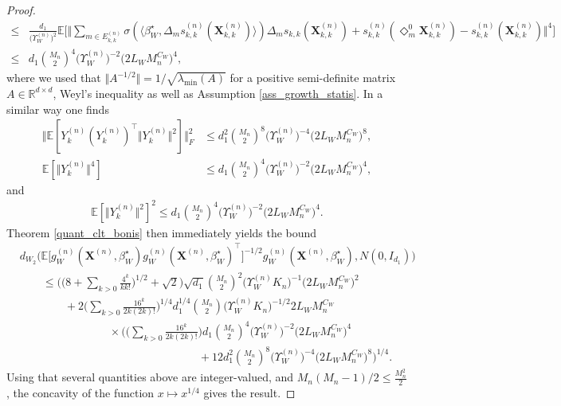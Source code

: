 \documentclass{article}
\begin{document}
\begin{proof}
\begin{align*}
        \leq &  \frac{d_1}{\big(\Upsilon_W^{(n)}\big)^2}  \mathbb{E}\bigg[ \bigg\Vert \sum_{m\in E_{k,k}^{(n)}} \sigma ( \langle \beta_W^{\star} , \Delta_m s_{k,k}^{(n)}(\mathbf{X}_{k,k}^{(n)}) \rangle )  \Delta_m s_{k,k}(\mathbf{X}_{k,k}^{(n)}) +  s_{k,k}^{(n)}(\Diamond_{m}^{0} \mathbf{X}_{k,k}^{(n)}) - s_{k,k}^{(n)}(\mathbf{X}_{k,k}^{(n)}) \bigg\Vert^4 \bigg] \\
        \leq & d_1 \binom{M_n}{2}^4 \big(\Upsilon_W^{(n)}\big)^{-2} \big(2 L_W M_n^{C_W}  \big)^4,
    \end{align*}
    where we used that $\Vert A^{-1/2} \Vert = 1/\sqrt{\lambda_\mathrm{min}(A)}$ for a positive semi-definite matrix $A \in \mathbb{R}^{d \times d}$, Weyl's inequality as well as Assumption \ref{ass_growth_statis}. In a similar way one finds
    \begin{align*}
         \Vert \mathbb{E}[Y_k^{(n)}(Y_k^{(n)})^{\top} \Vert Y_k^{(n)} \Vert^2 ] \Vert_F^2 & \leq d_1^2 \binom{M_n}{2}^8 \big(\Upsilon_W^{(n)}\big)^{-4} \big(2 L_W M_n^{C_W}  \big)^8, \\
         \mathbb{E}[ \Vert Y_k^{(n)}  \Vert^4 ] &\leq d_1 \binom{M_n}{2}^4 \big(\Upsilon_W^{(n)}\big)^{-2} \big(2 L_W M_n^{C_W}  \big)^4, 
    \end{align*}
    and 
    \begin{align*}
         \mathbb{E}[ \Vert Y_k^{(n)} \Vert^2 ]^2 \leq d_1 \binom{M_n}{2}^4 \big(\Upsilon_W^{(n)}\big)^{-2} \big(2 L_W M_n^{C_W}  \big)^4.
    \end{align*}
    Theorem \ref{quant_clt_bonis} then immediately yields the bound
    \begin{align*}
        &d_{W_2}\Big( \mathbb{E}\big[g_W^{(n)}(\mathbf{X}^{(n)},\beta_W^{\star})g_W^{(n)}(\mathbf{X}^{(n)},\beta_W^{\star})^{\top} \big]^{-1/2} g_W^{(n)}(\mathbf{X}^{(n)},\beta_W^{\star}) , N(0,I_{d_1})  \Big) \\
        & \qquad \leq \bigg(\bigg( 8+\sum_{k>0} \frac{4^k}{kk!} \bigg)^{1/2} + \sqrt{2}\bigg) \sqrt{d_1} \binom{M_n}{2}^2 \big(\Upsilon_W^{(n)}K_n\big)^{-1} \big(2 L_W M_n^{C_W}  \big)^2  \\
        & \qquad \qquad + 2\bigg( \sum_{k> 0} \frac{16^k}{2k(2k)!} \bigg)^{1/4} d_1^{1/4} \binom{M_n}{2} \big(\Upsilon_W^{(n)} K_n\big)^{-1/2}  2 L_W M_n^{C_W} \\
        & \qquad \qquad  \qquad \qquad \times \bigg( \bigg( \sum_{k>0} \frac{16^k}{2k(2k)!} \bigg) d_1 \binom{M_n}{2}^4 \big(\Upsilon_W^{(n)}\big)^{-2} \big(2 L_W M_n^{C_W}  \big)^4 \\
        & \qquad \qquad  \qquad \qquad \qquad \qquad  \qquad \qquad + 12 d_1^2 \binom{M_n}{2}^8 \big(\Upsilon_W^{(n)}\big)^{-4} \big(2 L_W M_n^{C_W}  \big)^8 \bigg)^{1/4}.
    \end{align*}
    Using that several quantities above are integer-valued, and $M_n(M_n-1)/2 \leq \frac{M_n^2}{2}$, the concavity of the function $x \mapsto x^{1/4}$ gives the result.
\end{proof}
\end{document}
